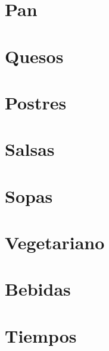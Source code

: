 \documentclass[twoside,12pt]{article}
\begin{document}
\section{Pan}



\section{Quesos}



\section{Postres}

















\section{Salsas}






\section{Sopas}



\section{Vegetariano}


\section{Bebidas}


\section{Tiempos}

\end{document}
